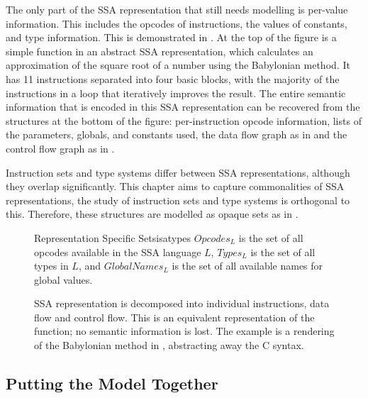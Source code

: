     The only part of the SSA representation that still needs modelling is
    per-value information.
    This includes the opcodes of instructions, the values of constants,
    and type information.
    This is demonstrated in .
    At the top of the figure is a simple function in an abstract SSA
    representation, which calculates an approximation of the square root of a
    number using the Babylonian method.
    It has 11 instructions separated into four basic blocks, with the majority
    of the instructions in a loop that iteratively improves the result.
    The entire semantic information that is encoded in this SSA representation
    can be recovered from the structures at the bottom of the figure:
    per-instruction opcode information, lists of the parameters, globals, and
    constants used, the data flow graph as in  and the control
    flow graph as in .

    Instruction sets and type systems differ between SSA representations,
    although they overlap significantly.
    This chapter aims to capture commonalities of SSA representations, the study
    of instruction sets and type systems is orthogonal to this.
    Therefore, these structures are modelled as opaque sets as in
    .

\begin{figure}[h]
\begin{definition}{Representation Specific Sets}{isatypes}
    $Opcodes_L$ is the set of all opcodes available in the SSA language $L$,
    $Types_L$ is the set of all types in $L$,
    and $GlobalNames_L$ is the set of all available names for global values.
\end{definition}
\end{figure}

\begin{figure}[p]

\caption{SSA representation is decomposed into individual instructions, data
         flow and control flow.
         This is an equivalent representation of the function; no semantic
         information is lost.
         The example is a rendering of the Babylonian method in
         , abstracting away the C syntax.}
\label{fig:separation}
\end{figure}

\subsection{Putting the Model Together}

